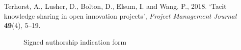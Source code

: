 
\hangindent=0.5cm Terhorst, A., Lusher, D., Bolton, D., Elsum, I. and Wang, P., 2018. \lq Tacit knowledge sharing in open innovation projects\rq, \textit{Project Management Journal} \textbf{49}(4), 5--19.

\begin{figure}
    \centering
    \caption{Signed authorship indication form}
    \label{fig:authorship}
\end{figure}

